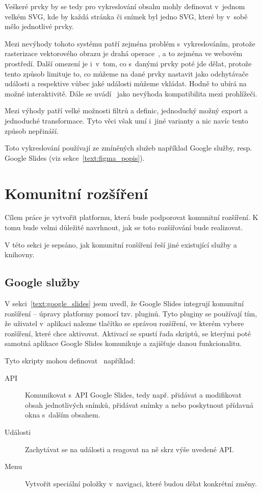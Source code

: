 Veškeré prvky by se tedy pro vykreslování obsahu mohly definovat v~jednom velkém SVG, kde by každá stránka či snímek byl jedno SVG, které by v~sobě mělo jednotlivé prvky.

Mezi nevýhody tohoto systému patří zejména problém s~vykreslováním, protože rasterizace vektorového obrazu je drahá operace~\cite{svg_css_html}, a to zejména ve webovém prostředí.
Další omezení je i~v~tom, co s~danými prvky poté jde dělat, protože tento způsob limituje to, co můžeme na dané prvky nastavit jako odchytávače události a respektive vůbec jaké události můžeme vkládat.
Hodně to ubírá na možné interaktivitě.
Dále se uvádí~\cite{svg_css_html} jako nevýhoda kompatibilita mezi prohlížeči.

Mezi výhody patří velké možnosti filtrů a definic, jednoduchý možný export a jednoduché transformace.
Tyto věci však umí i~jiné varianty a nic navíc tento způsob nepřináší.

Toto vykreslování používají ze zmíněných služeb například Google služby, resp. Google Slides (viz sekce~\ref{text:figma_popis}).

\section{Komunitní rozšíření}\label{text:community_plugins}

Cílem práce je vytvořit platformu, která bude podporovat komunitní rozšíření.
K tomu bude velmi důležité navrhnout, jak se toto rozšiřování bude realizovat.

V této sekci je sepsáno, jak komunitní rozšíření řeší jiné existující služby a knihovny.

\subsection{Google služby}

V sekci~\ref{text:google_slides} jsem uvedl, že Google Slides integrují komunitní rozšíření -- úpravy platformy pomocí tzv. pluginů.
Tyto pluginy se používají tím, že uživatel v~aplikaci nalezne tlačítko se správou rozšíření, ve kterém vybere rozšíření, které chce aktivovat.
Aktivací se spustí řada skriptů, se kterými poté samotná aplikace Google Slides komunikuje a zajišťuje danou funkcionalitu.

Tyto skripty mohou definovat~\cite{google_apps} například:

\begin{description}
    \item[API] Komunikovat s~API Google Slides, tedy např. přidávat a modifikovat obsah jednotlivých snímků, přidávat snímky a nebo poskytnout přídavná okna s~dalším obsahem.
    \item[Události] Zachytávat se na události a reagovat na ně skrz výše uvedené API.
    \item[Menu] Vytvořit speciální položky v~navigaci, které budou dělat konkrétní změny.
\end{description}

